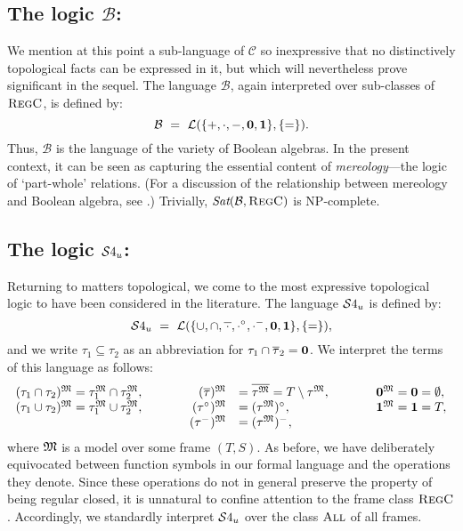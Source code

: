 \documentclass{LMCS}
\theoremstyle{plain}
\newcommand{\cB}{\ensuremath{\mathcal{B}}}\newcommand{\cBc}{\ensuremath{\mathcal{B}c}}\newcommand{\cBcc}{\ensuremath{\mathcal{B}cc}}
\newcommand{\cBC}{\ensuremath{\mathcal{C}}}
\newcommand{\ti}[2][]{#2^{\circ_{#1}}}
\newcommand{\tc}[2][]{#2^{-_{#1}}}
\newcommand{\compl}[2][]{\overline{#2}}
\newcommand{\Sat}{\textit{Sat}}
\newcommand{\All}{\textsc{All}}
\newcommand{\Regc}{\textsc{RegC}}
\newcommand{\NP}{\textsc{NP}}
\newcommand{\Res}{{S}}\newcommand{\RegC}{\textsc{RC}}
\begin{document}
\subsection*{The logic $\cB$:}
We mention at this point a sub-language of $\cBC$ so inexpressive that
no distinctively topological facts can be expressed in it, but which
will nevertheless prove significant in the sequel.  The language
$\cB$, again interpreted over sub-classes of $\Regc$, is defined by:
\begin{equation*}
\cB ~=~ \cL(\{+, \cdot, -, \zero, \one \}, \{=\}).
\end{equation*}
Thus, $\cB$ is the language of the variety of Boolean algebras.  In the present context,
it can be seen as capturing the essential content of \emph{mereology}---the
logic of `part-whole' relations.  (For a discussion
of the relationship between mereology and Boolean algebra, see
\cite{Tarski35,Grzegorczyk55}.) Trivially, $\Sat(\cB,\Regc)$ is
\NP-complete.



\subsection*{The logic $\mathcal{S}4_u$: }
Returning to matters topological, we come to the most expressive
topological logic to have been considered in the literature.
The language $\mathcal{S}4_u$ is defined by:
\begin{equation*}
\SFU ~=~
   \cL(\{\cup, \cap, \overline{\, \cdot\, }, \ti{\cdot}, \tc{\cdot}, \zero, \one \},\{=\}),
\end{equation*}
and we write $\tau_1 \subseteq \tau_2$ as an abbreviation for $\tau_1
\cap \compl{\tau}_2 = \zero$.  We interpret the terms of this language
as follows:
\begin{equation}
\begin{array}{lrll}
(\tau_1 \cap \tau_2)^\fM = \tau_1^\fM \cap \tau_2^\fM, \hspace{1cm} &
(\compl{\tau})^\fM &= \compl{\tau^\fM} = T \setminus \tau^\fM,
  \hspace{1cm} & \zero^\fM = \zero = \emptyset,\\
(\tau_1 \cup \tau_2)^\fM = \tau_1^\fM \cup \tau_2^\fM,  &
(\ti{\tau})^\fM &= \ti{(\tau^\fM)}, & \one^\fM = \one = T,\\
& (\tc{\tau})^\fM &= \tc{(\tau^\fM)},
\end{array}
\label{eq:semRC}
\end{equation}
where $\mathfrak{M}$ is a model over some frame $(T, \Res)$. As before, we
have deliberately equivocated between
function symbols in our formal language and the operations they
denote.  Since these operations do not in general preserve the
property of being regular closed, it is unnatural to confine attention
to the frame class $\Regc$. Accordingly, we standardly interpret
$\mathcal{S}4_u$ over the class $\All$ of all frames.
\end{document}
